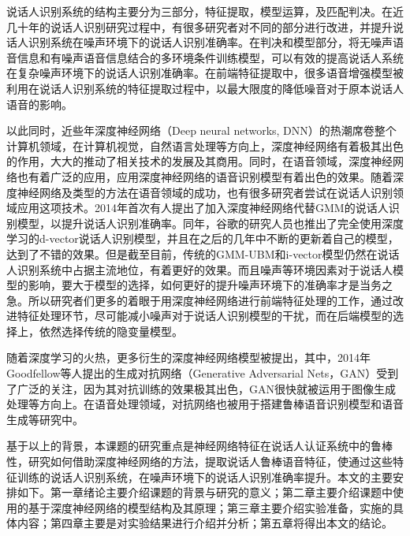 \documentclass[a4paper,oneside,12pt]{book}
\begin{document}
说话人识别系统的结构主要分为三部分，特征提取，模型运算，及匹配判决。在近几十年的说话人识别研究过程中，有很多研究者对不同的部分进行改进，并提升说话人识别系统在噪声环境下的说话人识别准确率。在判决和模型部分，将无噪声语音信息和有噪声语音信息结合的多环境条件训练模型，可以有效的提高说话人系统在复杂噪声环境下的说话人识别准确率\cite{lei2013noise}。在前端特征提取中，很多语音增强模型被利用在说话人识别系统的特征提取过程中，以最大限度的降低噪音对于原本说话人语音的影响\cite{erkelens2007minimum}。


以此同时，近些年深度神经网络（Deep neural networks, DNN）的热潮席卷整个计算机领域，在计算机视觉，自然语言处理等方向上，深度神经网络有着极其出色的作用，大大的推动了相关技术的发展及其商用\cite{lecun2015deep}。同时，在语音领域，深度神经网络也有着广泛的应用，应用深度神经网络的语音识别模型有着出色的效果\cite{hinton2012deep}。随着深度神经网络及类型的方法在语音领域的成功，也有很多研究者尝试在说话人识别领域应用这项技术。2014年首次有人提出了加入深度神经网络代替GMM的说话人识别模型\cite{lei2014novel}，以提升说话人识别准确率。同年，谷歌的研究人员也推出了完全使用深度学习的d-vector说话人识别模型\cite{variani2014deep}，并且在之后的几年中不断的更新着自己的模型，达到了不错的效果。但是截至目前，传统的GMM-UBM和i-vector模型仍然在说话人识别系统中占据主流地位，有着更好的效果。而且噪声等环境因素对于说话人模型的影响，要大于模型的选择，如何更好的提升噪声环境下的准确率才是当务之急。所以研究者们更多的着眼于用深度神经网络进行前端特征处理的工作，通过改进特征处理环节，尽可能减小噪声对于说话人识别模型的干扰\cite{xu2015regression}\cite{kolbk2017speech}，而在后端模型的选择上，依然选择传统的隐变量模型。

随着深度学习的火热，更多衍生的深度神经网络模型被提出，其中，2014年Goodfellow等人提出的生成对抗网络（Generative Adversarial Nets，GAN）受到了广泛的关注\cite{goodfellow2014generative}，因为其对抗训练的效果极其出色，GAN很快就被运用于图像生成处理等方向上。在语音处理领域，对抗网络也被用于搭建鲁棒语音识别模型\cite{shinohara2016adversarial}和语音生成\cite{mogren2016c}等研究中。


基于以上的背景，本课题的研究重点是神经网络特征在说话人认证系统中的鲁棒性，研究如何借助深度神经网络的方法，提取说话人鲁棒语音特征，使通过这些特征训练的说话人识别系统，在噪声环境下的说话人识别准确率提升。本文的主要安排如下。第一章绪论主要介绍课题的背景与研究的意义；第二章主要介绍课题中使用的基于深度神经网络的模型结构及其原理；第三章主要介绍实验准备，实施的具体内容；第四章主要是对实验结果进行介绍并分析；第五章将得出本文的结论。
\end{document}
